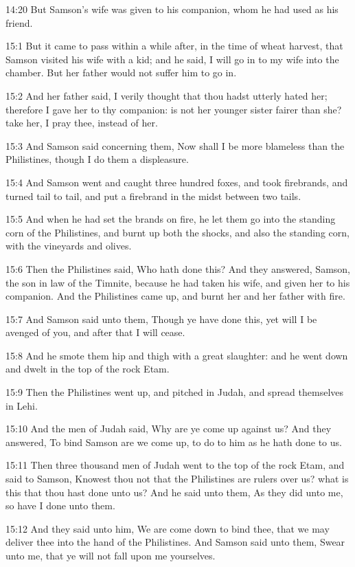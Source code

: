 14:20 But Samson's wife was given to his companion, whom he had used as his friend.

15:1 But it came to pass within a while after, in the time of wheat harvest, that Samson visited his wife with a kid; and he said, I will go in to my wife into the chamber. But her father would not suffer him to go in.

15:2 And her father said, I verily thought that thou hadst utterly hated her; therefore I gave her to thy companion: is not her younger sister fairer than she? take her, I pray thee, instead of her.

15:3 And Samson said concerning them, Now shall I be more blameless than the Philistines, though I do them a displeasure.

15:4 And Samson went and caught three hundred foxes, and took firebrands, and turned tail to tail, and put a firebrand in the midst between two tails.

15:5 And when he had set the brands on fire, he let them go into the standing corn of the Philistines, and burnt up both the shocks, and also the standing corn, with the vineyards and olives.

15:6 Then the Philistines said, Who hath done this? And they answered, Samson, the son in law of the Timnite, because he had taken his wife, and given her to his companion. And the Philistines came up, and burnt her and her father with fire.

15:7 And Samson said unto them, Though ye have done this, yet will I be avenged of you, and after that I will cease.

15:8 And he smote them hip and thigh with a great slaughter: and he went down and dwelt in the top of the rock Etam.

15:9 Then the Philistines went up, and pitched in Judah, and spread themselves in Lehi.

15:10 And the men of Judah said, Why are ye come up against us? And they answered, To bind Samson are we come up, to do to him as he hath done to us.

15:11 Then three thousand men of Judah went to the top of the rock Etam, and said to Samson, Knowest thou not that the Philistines are rulers over us? what is this that thou hast done unto us? And he said unto them, As they did unto me, so have I done unto them.

15:12 And they said unto him, We are come down to bind thee, that we may deliver thee into the hand of the Philistines. And Samson said unto them, Swear unto me, that ye will not fall upon me yourselves.

